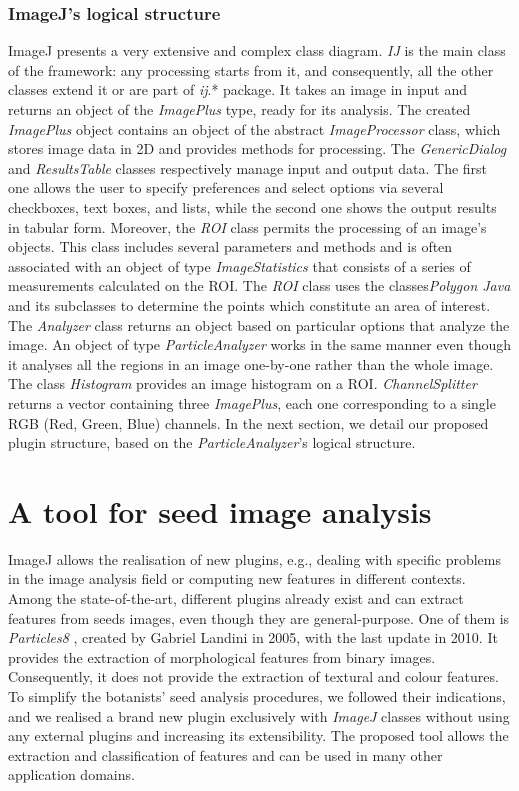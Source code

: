 \documentclass{svjour3}                     %
\begin{document}
\subsubsection{ImageJ's logical structure}
ImageJ presents a very extensive and complex class diagram.
\emph{IJ} is the main class of the framework: any processing starts from it, and consequently, all the other classes extend it or are part of \emph{ij}.* package. It takes an image in input and returns an object of the \emph{ImagePlus} type, ready for its analysis.
The created \emph{ImagePlus} object contains an object of the abstract \emph{ImageProcessor} class, which stores image data in 2D and provides methods for processing.
The \emph{GenericDialog} and \emph{ResultsTable} classes respectively manage input and output data. The first one allows the user to specify preferences and select options via several checkboxes, text boxes, and lists, while the second one shows the output results in tabular form. Moreover, the \emph{ROI} class permits the processing of an image's objects.
This class includes several parameters and methods and is often associated with an object of type \emph{ImageStatistics} that consists of a series of measurements calculated on the ROI. The \emph{ROI} class uses the classes\emph{Polygon Java } and its subclasses to determine the points which constitute an area of interest. The \emph{Analyzer} class returns an object based on particular options that analyze the image. An object of type \emph{ParticleAnalyzer} works in the same manner even though it analyses all the regions in an image one-by-one rather than the whole image. 
The class \emph{Histogram} provides an image histogram on a ROI. 
\emph{ChannelSplitter} returns a vector containing three \emph{ImagePlus}, each one corresponding to a single RGB (Red, Green, Blue) channels.
In the next section, we detail our proposed plugin structure, based on the \emph{ParticleAnalyzer}'s logical structure.


\section{A tool for seed image analysis}
ImageJ allows the realisation of new plugins, e.g., dealing with specific problems in the image analysis field or computing new features in different contexts.
Among the state-of-the-art, different plugins already exist and can extract features from seeds images, even though they are general-purpose. One of them is \emph{Particles8} \cite{Landini}, created by Gabriel Landini in 2005, with the last update in 2010. It provides the extraction of morphological features from binary images. Consequently, it does not provide the extraction of textural and colour features.
To simplify the botanists' seed analysis procedures, we followed their indications, and we realised a brand new plugin exclusively with \emph{ImageJ} classes without using any external plugins and increasing its extensibility. The proposed tool allows the extraction and classification of features and can be used in many other application domains.
\end{document}
